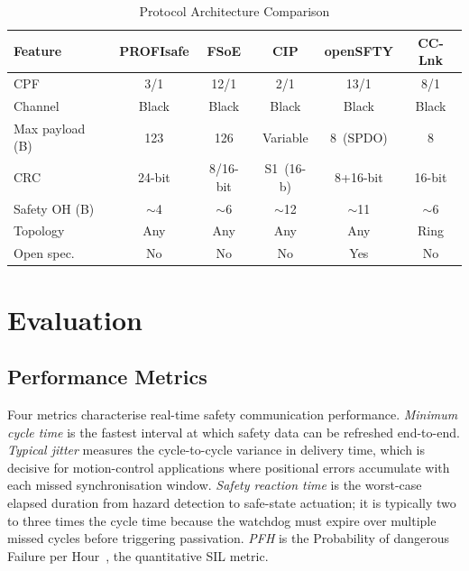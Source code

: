\documentclass[conference]{IEEEtran}
\begin{document}
\begin{table}[h]
\caption{Protocol Architecture Comparison \cite{IEC617843}}
\label{tab:arch}
\centering
\scriptsize
\setlength{\tabcolsep}{3pt}
\renewcommand{\arraystretch}{1.15}
\begin{tabular}{l|ccccc}
\toprule
\textbf{Feature} & \textbf{PROFIsafe} & \textbf{FSoE} & \textbf{CIP} &
\textbf{openSFTY} & \textbf{CC-Lnk} \\
\midrule
CPF              & 3/1    & 12/1     & 2/1        & 13/1       & 8/1 \\
Channel          & Black  & Black    & Black      & Black      & Black \\
Max payload (B)  & 123    & 126      & Variable   & 8~(SPDO)   & 8 \\
CRC              & 24-bit & 8/16-bit & S1~(16-b)  & 8+16-bit   & 16-bit \\
Safety OH (B)    & $\sim$4 & $\sim$6 & $\sim$12   & $\sim$11   & $\sim$6 \\
Topology         & Any    & Any      & Any        & Any        & Ring \\
Open spec.       & No     & No       & No         & Yes        & No \\
\bottomrule
\end{tabular}
\end{table}

\section{Evaluation}

\subsection{Performance Metrics}

Four metrics characterise real-time safety communication performance.
\emph{Minimum cycle time} is the fastest interval at which safety data
can be refreshed end-to-end. \emph{Typical jitter} measures the
cycle-to-cycle variance in delivery time, which is decisive for
motion-control applications where positional errors accumulate with each
missed synchronisation window. \emph{Safety reaction time} is the
worst-case elapsed duration from hazard detection to safe-state
actuation; it is typically two to three times the cycle time because
the watchdog must expire over multiple missed cycles before triggering
passivation. \emph{PFH} is the Probability of dangerous Failure per
Hour~\cite{IEC61508}, the quantitative SIL metric.
\end{document}
